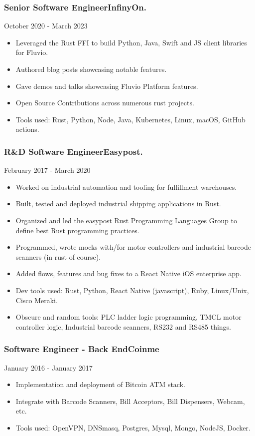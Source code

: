 \documentclass[9pt]{article}
\newenvironment{changemargin}[2]{%
  \begin{list}{}{%
    \setlength{\topsep}{0pt}%
    \setlength{\leftmargin}{#1}%
    \setlength{\rightmargin}{#2}%
    \setlength{\listparindent}{\parindent}%
    \setlength{\itemindent}{\parindent}%
    \setlength{\parsep}{\parskip}%
  }%
  \item[]}{\end{list}
}
\newenvironment{body} {
    \vspace*{-16pt}
    \begin{changemargin}{-0.20in}{-0.5in}
  }
    {\end{changemargin}
}
\newenvironment{jobdescriptionlist}[3]{
  \subsubsection*{#1\hfill\small#2}
  \small
  \vspace*{-5pt}
  {\hfill #3}
  \vspace*{-10pt}
  \begin{itemize}
   \setlength{\topsep}{0pt}
   \setlength{\itemsep}{1pt}
   \setlength{\parskip}{0pt}
   \setlength{\parsep}{0pt}
}{\end{itemize}\vspace*{-3pt}\normalsize}
\begin{document}
\begin{body}
    \vspace{18pt}
    \begin{jobdescriptionlist}{Senior Software Engineer}{InfinyOn.}{October 2020 - March 2023}
        \item Leveraged the Rust FFI to build Python, Java, Swift and JS client libraries for Fluvio.
        \item Authored blog posts showcasing notable features.
        \item Gave demos and talks showcasing Fluvio Platform features.
        \item Open Source Contributions across numerous rust projects.
        \item Tools used: Rust, Python, Node, Java, Kubernetes, Linux, macOS, GitHub actions.
    \end{jobdescriptionlist}

    \begin{jobdescriptionlist}{R\&D Software Engineer}{Easypost.}{February 2017 - March 2020}
        \item Worked on industrial automation and tooling for fulfillment warehouses.
        \item Built, tested and deployed industrial shipping applications in Rust.
        \item Organized and led the easypost Rust Programming Languages Group to define best Rust programming practices.
        \item Programmed, wrote mocks with/for motor controllers and industrial barcode scanners (in rust of course).
        \item Added flows, features and bug fixes to a React Native iOS enterprise app.
        \item Dev tools used: Rust, Python, React Native (javascript), Ruby, Linux/Unix, Cisco Meraki.
        \item Obscure and random tools: PLC ladder logic programming, TMCL motor controller logic, Industrial barcode scanners, RS232 and RS485 things.
    \end{jobdescriptionlist}

    \begin{jobdescriptionlist}{Software Engineer - Back End}{Coinme}{January 2016 - January 2017}
        \item Implementation and deployment of Bitcoin ATM stack.
        \item Integrate with Barcode Scanners, Bill Acceptors, Bill Dispensers, Webcam, etc.
        \item Tools used: OpenVPN, DNSmasq, Postgres, Mysql, Mongo, NodeJS, Docker.
    \end{jobdescriptionlist}


\end{body}
\end{document}
